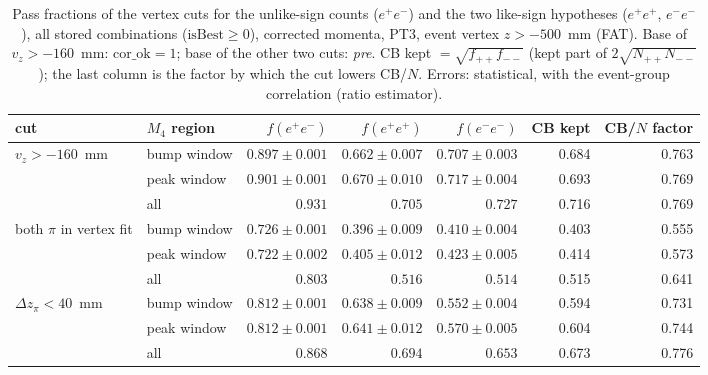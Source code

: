 \begin{table}[H]
\centering
\scriptsize
\caption{Pass fractions of the vertex cuts for the unlike-sign counts ($e^+e^-$) and the two like-sign hypotheses ($e^+e^+$, $e^-e^-$), all stored combinations ($\mathrm{isBest}\ge0$), corrected momenta, PT3, event vertex $z>-500$~mm (FAT). Base of $v_z>-160$~mm: $\mathrm{cor\_ok}=1$; base of the other two cuts: \emph{pre}. CB kept $=\sqrt{f_{++}f_{--}}$ (kept part of $2\sqrt{N_{++}N_{--}}$); the last column is the factor by which the cut lowers CB/$N$. Errors: statistical, with the event-group correlation (ratio estimator).}
\label{tab:spec_vertexcut}
\begin{tabular}{llrrrrr}
\toprule
cut & $M_4$ region & $f(e^+e^-)$ & $f(e^+e^+)$ & $f(e^-e^-)$ & CB kept & CB/$N$ factor \\
\midrule
$v_z>-160$~mm & bump window & $0.897\pm0.001$ & $0.662\pm0.007$ & $0.707\pm0.003$ & 0.684 & 0.763 \\
 & peak window & $0.901\pm0.001$ & $0.670\pm0.010$ & $0.717\pm0.004$ & 0.693 & 0.769 \\
 & all & $0.931$ & $0.705$ & $0.727$ & 0.716 & 0.769 \\
\midrule
both $\pi$ in vertex fit & bump window & $0.726\pm0.001$ & $0.396\pm0.009$ & $0.410\pm0.004$ & 0.403 & 0.555 \\
 & peak window & $0.722\pm0.002$ & $0.405\pm0.012$ & $0.423\pm0.005$ & 0.414 & 0.573 \\
 & all & $0.803$ & $0.516$ & $0.514$ & 0.515 & 0.641 \\
\midrule
$\Delta z_\pi<40$~mm & bump window & $0.812\pm0.001$ & $0.638\pm0.009$ & $0.552\pm0.004$ & 0.594 & 0.731 \\
 & peak window & $0.812\pm0.001$ & $0.641\pm0.012$ & $0.570\pm0.005$ & 0.604 & 0.744 \\
 & all & $0.868$ & $0.694$ & $0.653$ & 0.673 & 0.776 \\
\bottomrule
\end{tabular}
\end{table}
